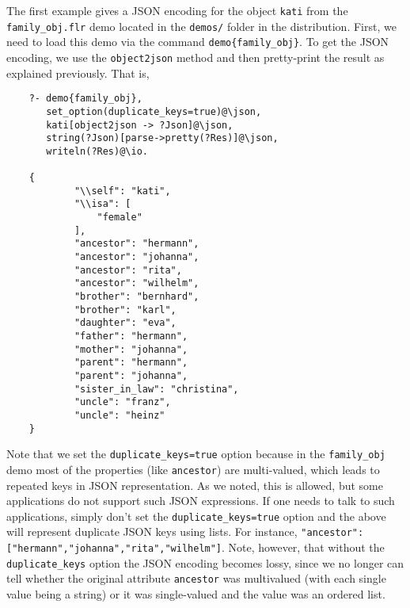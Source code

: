 The first example gives a JSON encoding for the object \texttt{kati} from
the \texttt{family\_obj.flr} demo located in the \texttt{demos/} folder in
the \ERGO distribution.   First, we need to load this demo via the command
\texttt{demo\{family\_obj\}}. To get the JSON encoding, we use the
\texttt{object2json} method and then pretty-print the result  as explained
previously. That is,
\begin{verbatim}
    ?- demo{family_obj},
       set_option(duplicate_keys=true)@\json,
       kati[object2json -> ?Json]@\json,
       string(?Json)[parse->pretty(?Res)]@\json,
       writeln(?Res)@\io.

    {
            "\\self": "kati",
            "\\isa": [
                "female"
            ],
            "ancestor": "hermann",
            "ancestor": "johanna",
            "ancestor": "rita",
            "ancestor": "wilhelm",
            "brother": "bernhard",
            "brother": "karl",
            "daughter": "eva",
            "father": "hermann",
            "mother": "johanna",
            "parent": "hermann",
            "parent": "johanna",
            "sister_in_law": "christina",
            "uncle": "franz",
            "uncle": "heinz"
    }
\end{verbatim}
Note that we set the \texttt{duplicate\_keys=true} option because in the
\texttt{family\_obj} demo most of the properties (like \texttt{ancestor})
are multi-valued, which leads to repeated keys in JSON representation.
As we noted, this is allowed, but some applications do not support such
JSON expressions. If one needs to talk to such applications, simply don't
set the \texttt{duplicate\_keys=true} option and the above will represent
duplicate JSON keys using lists. For instance,
\texttt{"ancestor":["hermann","johanna","rita","wilhelm"]}.
Note, however, that without the \texttt{duplicate\_keys}
option the JSON encoding becomes
lossy, since we no longer can tell whether the original \ERGO
attribute \texttt{ancestor}
was multivalued (with each single value being a string)
or it was single-valued and the value was an ordered list.


